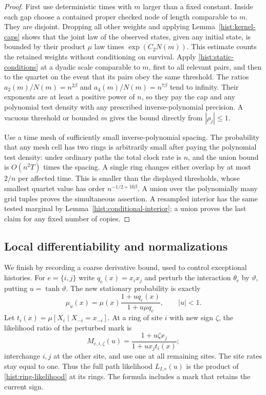 \begin{proof}
First use deterministic times with $m$ larger than a fixed constant.
Inside each gap choose a contained proper checked node of length comparable
to $m$.  They are disjoint.  Dropping all other weights and applying
Lemma~\ref{hist:kernel-caps} shows that the joint law of the observed states,
given any initial state, is bounded by their product $\mu$ law times
$\exp(C_2N(m))$.  This estimate counts the retained weights without
conditioning on survival.  Apply \eqref{hist:static-conditions} at a
dyadic scale comparable to $m$, first to all relevant pairs, and then to
the quartet on the event that its pairs obey the same threshold.  The
ratios $a_2(m)/N(m)=n^{2\beta}$ and $a_4(m)/N(m)=n^{7\beta}$ tend to
infinity.  Their exponents are at least a positive power of $n$, so they
pay the cap and any polynomial test density with any prescribed
inverse-polynomial precision.  A vacuous threshold or bounded $m$ gives
the bound directly from $|\rho_j|\le1$.

Use a time mesh of sufficiently small inverse-polynomial spacing.  The
probability that any mesh cell has two rings is arbitrarily small after
paying the polynomial test density: under ordinary paths the total clock
rate is $n$, and the union bound is $O(n^2T)$ times the spacing.  A single
ring changes either overlap by at most $2/n$ per affected time.  This is
smaller than the displayed thresholds, whose smallest quartet value has
order $n^{-1/2+10\beta}$.  A union over the polynomially many grid tuples
proves the simultaneous assertion.  A resampled interior has the same
tested marginal by Lemma~\ref{hist:conditional-interior}; a union proves the
last claim for any fixed number of copies.
\end{proof}

\subsection{Local differentiability and normalizations}

We finish by recording a coarse derivative bound, used to control exceptional
histories.  For $e=\{i,j\}$ write $q_e(x)=x_ix_j$ and perturb the interaction
$\theta_e$ by $\vartheta$, putting $u=\tanh\vartheta$.  The new stationary
probability is exactly
\begin{equation}\label{hist:stationary-perturbation}
 \mu_u(x)=\mu(x)\frac{1+u q_e(x)}{1+u\mu q_e},\qquad |u|<1.
\end{equation}
Let $t_i(x)=\mu[X_i\mid X_{-i}=x_{-i}]$.  At a ring of site $i$ with new
sign $\zeta$, the likelihood ratio of the perturbed mark is
\begin{equation}\label{hist:ring-likelihood}
 M_{e,i,\zeta}(u)=\frac{1+u\zeta x_j}{1+u x_jt_i(x)};
\end{equation}
interchange $i,j$ at the other site, and use one at all remaining sites.
The site rates stay equal to one.  Thus the full path likelihood
$L_{I,e}(u)$ is the product of \eqref{hist:ring-likelihood} at its rings.
The formula includes a mark that retains the current sign.

